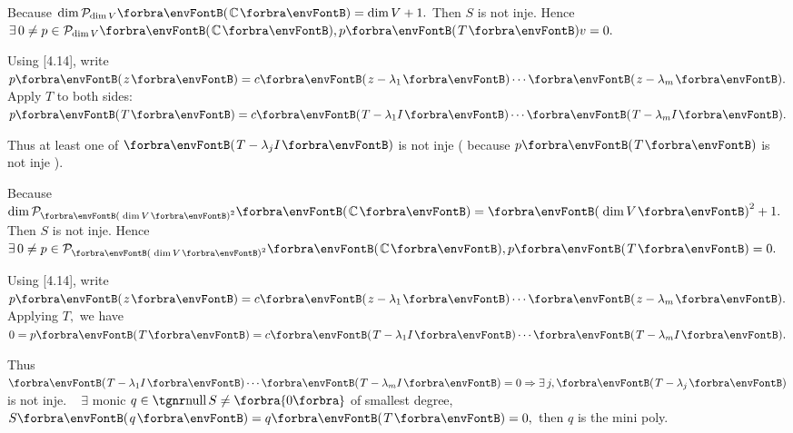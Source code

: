 \documentclass[a4paper, 11pt, UTF8]{article}
\begin{document}
\begin{large}
\par\quad
Because $\dim\PoC{\dim V}=\dim V+1.$ Then $S$ is not inje. Hence $\exists\,0\neq p\in\PoC{\dim V},p\Par{T}v=0.$\par\quad
Using [4.14], write $p\Par{z}=c\Par{z-\lambda_1}\cdots\Par{z-\lambda_m}.$ Apply $T$ to both sides: $p\Par{T}=c\Par{T-\lambda_1 I}\cdots\Par{T-\lambda_m I}.$\par\quad
Thus at least one of $\Par{T-\lambda_j I}$ is not inje ( because $p\Par{T}$ is not inje ).\PfEnd
\SepLine


\par\quad
Because $\dim\PoC{\Par{\dim V}^2}=\Par{\dim V}^2+1.$ Then $S$ is not inje. Hence $\exists\,0\neq p\in\PoC{\Par{\dim V}^2},p\Par{T}=0.$\par\quad
Using [4.14], write $p\Par{z}=c\Par{z-\lambda_1}\cdots\Par{z-\lambda_m}.$ Applying $T,$ we have $0=p\Par{T}=c\Par{T-\lambda_1 I}\cdots\Par{T-\lambda_m I}.$\par\quad
Thus $\Par{T-\lambda_1 I}\cdots\Par{T-\lambda_m I}=0\Rightarrow\exists\,j,\Par{T-\lambda_j}$ is not inje.\PfEnd\quad
\Comment\,\,\, $\exists$ monic $q\in\null S\neq \zeroSubs$ of smallest degree, $S\Par{q}=q\Par{T}=0,$ then $q$ is the {\tgsl mini poly.}\par
\SepLine


\end{large}
\end{document}
